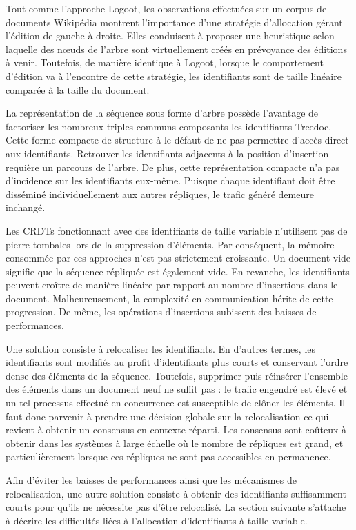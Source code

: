 \noindent Tout comme l'approche Logoot, les observations effectuées sur un
corpus de documents Wikipédia montrent l'importance d'une stratégie d'allocation
gérant l'édition de gauche à droite. Elles conduisent à proposer une heuristique
selon laquelle des nœuds de l'arbre sont virtuellement créés en prévoyance des
éditions à venir. Toutefois, de manière identique à Logoot, lorsque le
comportement d'édition va à l'encontre de cette stratégie, les identifiants sont
de taille linéaire comparée à la taille du document.

\noindent La représentation de la séquence sous forme d'arbre possède l'avantage
de factoriser les nombreux triples communs composants les identifiants
Treedoc. Cette forme compacte de structure à le défaut de ne pas permettre
d'accès direct aux identifiants. Retrouver les identifiants adjacents à la
position d'insertion requière un parcours de l'arbre. De plus, cette
représentation compacte n'a pas d'incidence sur les identifiants
eux-même. Puisque chaque identifiant doit être disséminé individuellement aux
autres répliques, le trafic généré demeure inchangé.

Les CRDTs fonctionnant avec des identifiants de taille variable n'utilisent pas
de pierre tombales lors de la suppression d'éléments. Par conséquent, la mémoire
consommée par ces approches n'est pas strictement croissante. Un document vide
signifie que la séquence répliquée est également vide. En revanche, les
identifiants peuvent croître de manière linéaire par rapport au nombre
d'insertions dans le document. Malheureusement, la complexité en communication
hérite de cette progression. De même, les opérations d'insertions subissent des
baisses de performances. 

Une solution consiste à relocaliser les identifiants. En d'autres termes, les
identifiants sont modifiés au profit d'identifiants plus courts et conservant
l'ordre dense des éléments de la séquence. Toutefois, supprimer puis réinsérer
l'ensemble des éléments dans un document neuf ne suffit pas : le trafic engendré
est élevé et un tel processus effectué en concurrence est susceptible de clôner
les éléments. Il faut donc parvenir à prendre une décision globale sur la
relocalisation ce qui revient à obtenir un consensus en contexte réparti. Les
consensus sont coûteux à obtenir dans les systèmes à large échelle où le nombre
de répliques est grand, et particulièrement lorsque ces répliques ne sont pas
accessibles en permanence.

Afin d'éviter les baisses de performances ainsi que les mécanismes de
relocalisation, une autre solution consiste à obtenir des identifiants
suffisamment courts pour qu'ils ne nécessite pas d'être relocalisé. La section
suivante s'attache à décrire les difficultés liées à l'allocation d'identifiants
à taille variable.

